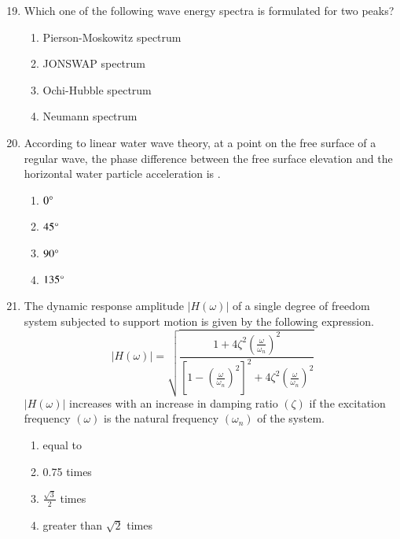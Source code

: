\documentclass[journal]{IEEEtran}
\theoremstyle{remark}
\begin{document}
\newpage
\vspace*{0.25cm}

\begin{enumerate}[itemsep=1em]
\setcounter{enumi}{18}
\item Which one of the following wave energy spectra is formulated for two peaks? 
\begin{enumerate}[leftmargin=2.5em, labelsep=0.5em, itemsep=0.5em]
    \item Pierson-Moskowitz spectrum 
    \item JONSWAP spectrum
    \item Ochi-Hubble spectrum
    \item Neumann spectrum
\end{enumerate}
\end{enumerate}

\begin{enumerate}[itemsep=1em]
\setcounter{enumi}{19}
\item According to linear water wave theory, at a point on the free surface of a regular wave, the phase difference between the free surface elevation and the horizontal water particle acceleration is \underline{\hspace{1cm}}. 
\begin{multicols}{4}
\begin{enumerate}
    \item $0\degree$
    \item $45\degree$
    \item $90\degree$
    \item $135\degree$
\end{enumerate}
\end{multicols}
\end{enumerate}

\begin{enumerate}[itemsep=1em]
\setcounter{enumi}{20}
\item The dynamic response amplitude $|H(\omega)|$ of a single degree of freedom system subjected to support motion is given by the following expression.
\[
|H(\omega)|=\sqrt{\frac{1+4\zeta^2(\frac{\omega}{\omega_n})^2}{[1-(\frac{\omega}{\omega_n})^2]^2+4\zeta^2(\frac{\omega}{\omega_n})^2}}
\]
$|H(\omega)|$ increases with an increase in damping ratio $(\zeta)$ if the excitation frequency $(\omega)$ is \underline{\hspace{1cm}} the natural frequency $(\omega_n)$ of the system.
\begin{multicols}{4}
\begin{enumerate}
    \item equal to
    \item 0.75 times
    \item $\frac{\sqrt{3}}{2}$ times
    \item greater than $\sqrt{2}$ times
\end{enumerate}
\end{multicols}
\end{enumerate}
\end{document}
